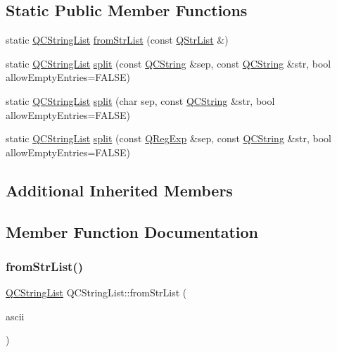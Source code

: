 \subsection*{Static Public Member Functions}
\begin{DoxyCompactItemize}
\item 
static \mbox{\hyperlink{class_q_c_string_list}{Q\+C\+String\+List}} \mbox{\hyperlink{class_q_c_string_list_a4e51237e213698b25bf72d5f3d25a1c8}{from\+Str\+List}} (const \mbox{\hyperlink{class_q_str_list}{Q\+Str\+List}} \&)
\item 
static \mbox{\hyperlink{class_q_c_string_list}{Q\+C\+String\+List}} \mbox{\hyperlink{class_q_c_string_list_ae46355a1739a9545bdc3ab9e37c83758}{split}} (const \mbox{\hyperlink{class_q_c_string}{Q\+C\+String}} \&sep, const \mbox{\hyperlink{class_q_c_string}{Q\+C\+String}} \&str, bool allow\+Empty\+Entries=F\+A\+L\+SE)
\item 
static \mbox{\hyperlink{class_q_c_string_list}{Q\+C\+String\+List}} \mbox{\hyperlink{class_q_c_string_list_a5e1404c397195e19b31dd31acd6da698}{split}} (char sep, const \mbox{\hyperlink{class_q_c_string}{Q\+C\+String}} \&str, bool allow\+Empty\+Entries=F\+A\+L\+SE)
\item 
static \mbox{\hyperlink{class_q_c_string_list}{Q\+C\+String\+List}} \mbox{\hyperlink{class_q_c_string_list_a6b29cc8c121790c5521b13d662fbf9fe}{split}} (const \mbox{\hyperlink{class_q_reg_exp}{Q\+Reg\+Exp}} \&sep, const \mbox{\hyperlink{class_q_c_string}{Q\+C\+String}} \&str, bool allow\+Empty\+Entries=F\+A\+L\+SE)
\end{DoxyCompactItemize}
\subsection*{Additional Inherited Members}


\subsection{Member Function Documentation}
\mbox{\label{class_q_c_string_list_a4e51237e213698b25bf72d5f3d25a1c8}} 
\subsubsection{\texorpdfstring{fromStrList()}{fromStrList()}}
{\footnotesize\ttfamily \mbox{\hyperlink{class_q_c_string_list}{Q\+C\+String\+List}} Q\+C\+String\+List\+::from\+Str\+List (\begin{DoxyParamCaption}\item[{const \mbox{\hyperlink{class_q_str_list}{Q\+Str\+List}} \&}]{ascii }\end{DoxyParamCaption})\hspace{0.3cm}{\ttfamily [static]}}

